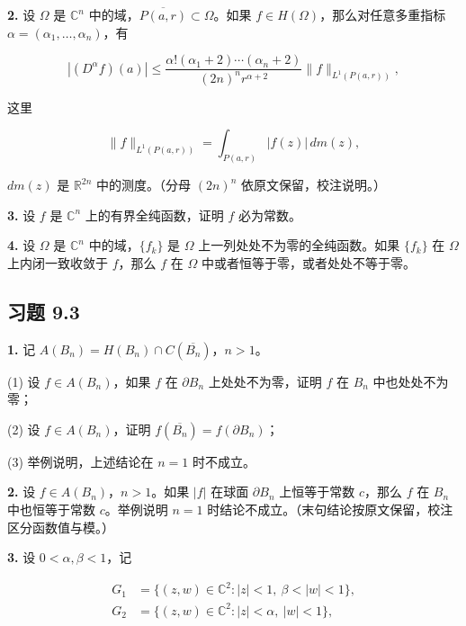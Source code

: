 \documentclass[11pt,a4paper]{article}
\begin{document}
\par{}
\noindent\textbf{2.} 设 \(\Omega\) 是 \(\mathbb C^n\)
中的域，\(\overline{P(a,r)}\subset\Omega\)。如果
\(f\in H(\Omega)\)，那么对任意多重指标
\(\alpha=(\alpha_1,\ldots,\alpha_n)\)，有

\[
|(D^\alpha f)(a)|\le
\frac{\alpha!(\alpha_1+2)\cdots(\alpha_n+2)}{(2n)^n r^{\alpha+2}}
\|f\|_{L^1(P(a,r))},
\]

这里

\[
\|f\|_{L^1(P(a,r))}=\int_{P(a,r)}|f(z)|\,dm(z),
\]

\(dm(z)\) 是 \(\mathbb R^{2n}\) 中的测度。（分母 \((2n)^n\)
依原文保留，校注说明。）

\par{}
\noindent\textbf{3.} 设 \(f\) 是 \(\mathbb C^n\) 上的有界全纯函数，证明 \(f\)
必为常数。

\par{}
\noindent\textbf{4.} 设 \(\Omega\) 是 \(\mathbb C^n\) 中的域，\(\{f_k\}\) 是
\(\Omega\) 上一列处处不为零的全纯函数。如果 \(\{f_k\}\) 在 \(\Omega\)
上内闭一致收敛于 \(f\)，那么 \(f\) 在 \(\Omega\)
中或者恒等于零，或者处处不等于零。

\subsection{习题 9.3}\label{ch09-practice-heading-4}

\par{}
\noindent\textbf{1.} 记 \(A(B_n)=H(B_n)\cap C(\overline{B_n})\)，\(n>1\)。

(1) 设 \(f\in A(B_n)\)，如果 \(f\) 在 \(\partial B_n\)
上处处不为零，证明 \(f\) 在 \(B_n\) 中也处处不为零；

(2) 设 \(f\in A(B_n)\)，证明 \(f(\overline{B_n})=f(\partial B_n)\)；

(3) 举例说明，上述结论在 \(n=1\) 时不成立。

\par{}
\noindent\textbf{2.} 设 \(f\in A(B_n)\)，\(n>1\)。如果 \(|f|\) 在球面
\(\partial B_n\) 上恒等于常数 \(c\)，那么 \(f\) 在 \(B_n\)
中也恒等于常数 \(c\)。举例说明 \(n=1\)
时结论不成立。（末句结论按原文保留，校注区分函数值与模。）

\par{}
\noindent\textbf{3.} 设 \(0<\alpha,\beta<1\)，记

\[
\begin{aligned}
G_1&=\{(z,w)\in\mathbb C^2:|z|<1,\ \beta<|w|<1\},\\
G_2&=\{(z,w)\in\mathbb C^2:|z|<\alpha,\ |w|<1\},
\end{aligned}
\]
\end{document}
